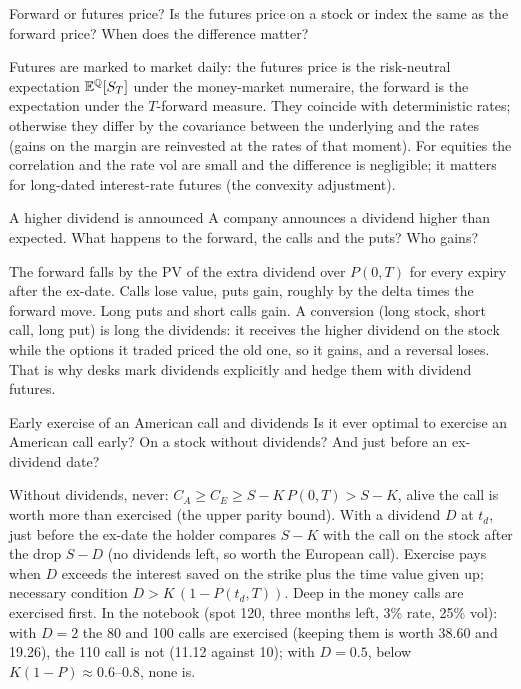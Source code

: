 \begin{question}{\Theory {}}{Forward or futures price?}
Is the futures price on a stock or index the same as the forward price? When does the difference matter?
\end{question}
\begin{answer}
Futures are marked to market daily: the futures price is the risk-neutral expectation $\mathbb{E}^{\mathbb{Q}}[S_T]$ under the
money-market numeraire, the forward is the expectation under the $T$-forward measure. They coincide with
deterministic rates; otherwise they differ by the covariance between the underlying and the rates (gains on the
margin are reinvested at the rates of that moment). For equities the correlation and the rate vol are small and the
difference is negligible; it matters for long-dated interest-rate futures (the convexity adjustment).
\end{answer}

\begin{question}{\Theory {}}{A higher dividend is announced}
A company announces a dividend higher than expected. What happens to the forward, the calls and the puts? Who gains?
\end{question}
\begin{answer}
The forward falls by the PV of the extra dividend over $P(0,T)$ for every expiry after the ex-date. Calls lose value,
puts gain, roughly by the delta times the forward move. Long puts and short calls gain. A conversion (long stock, short
call, long put) is long the dividends: it receives the higher dividend on the stock while the options it traded
priced the old one, so it gains, and a reversal loses. That is why desks mark dividends explicitly and hedge them with
dividend futures.
\end{answer}

\begin{question}{\Theory \Practice {}}{Early exercise of an American call and dividends}
Is it ever optimal to exercise an American call early? On a stock without dividends? And just before an ex-dividend
date?
\end{question}
\begin{answer}
Without dividends, never: $C_A \ge C_E \ge S - K\,P(0,T) > S - K$, alive the call is worth more than exercised (the upper
parity bound). With a dividend $D$ at $t_d$, just before the ex-date the holder compares $S - K$ with the call on the
stock after the drop $S - D$ (no dividends left, so worth the European call). Exercise pays when $D$ exceeds the interest
saved on the strike plus the time value given up; necessary condition $D > K\,(1 - P(t_d, T))$. Deep in the money calls
are exercised first. In the notebook (spot 120, three months left, 3\% rate, 25\% vol): with $D = 2$ the 80 and 100
calls are exercised (keeping them is worth 38.60 and 19.26), the 110 call is not (11.12 against 10); with $D = 0.5$,
below $K(1 - P) \approx 0.6$--$0.8$, none is.
\end{answer}

